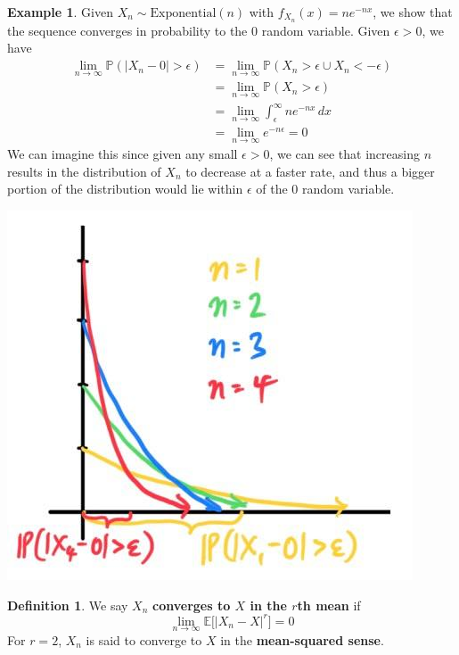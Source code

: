 \documentclass{article}
\theoremstyle{definition}
\newtheorem{example}{Example}[section]
\theoremstyle{remark}
\theoremstyle{definition}
\newtheorem{definition}{Definition}[section]
\begin{document}
\begin{example}
Given $X_n \sim \mathrm{Exponential}(n)$ with $f_{X_n} (x) = n e^{-nx}$, we show that the sequence converges in probability to the $0$ random variable. Given $\epsilon > 0$, we have 
\begin{align*}
    \lim_{n \rightarrow \infty} \mathbb{P}(|X_n - 0| > \epsilon) & = \lim_{n \rightarrow \infty} \mathbb{P}(X_n > \epsilon \cup X_n < -\epsilon) \\
    & = \lim_{n \rightarrow \infty} \mathbb{P}(X_n > \epsilon) \\
    & = \lim_{n \rightarrow \infty} \int_\epsilon^\infty n e^{-nx} \,dx \\
    & = \lim_{n \rightarrow \infty} e^{-n \epsilon} = 0
\end{align*}
We can imagine this since given any small $\epsilon > 0$, we can see that increasing $n$ results in the distribution of $X_n$ to decrease at a faster rate, and thus a bigger portion of the distribution would lie within $\epsilon$ of the $0$ random variable. 
\begin{center}
    \includegraphics[scale=0.3]{img/convergence_in_prob_exponential.jpg}
\end{center}
\end{example}

\begin{definition}
We say $X_n$ \textbf{converges to $X$ in the $r$th mean} if 
\[\lim_{n \rightarrow \infty} \mathbb{E} \big[ |X_n - X|^r \big] = 0\]
For $r = 2$, $X_n$ is said to converge to $X$ in the \textbf{mean-squared sense}. 
\end{definition}
\end{document}
